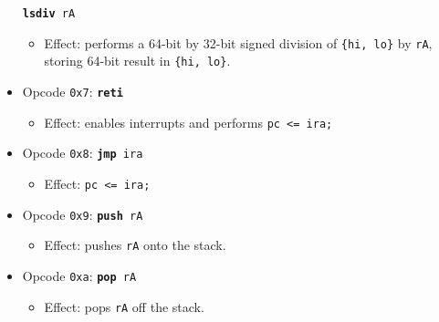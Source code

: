 \documentclass{article}
\begin{document}
\begin{itemize}
			\texttt{\textbf{lsdiv} rA}
		\begin{itemize}
			\item Effect:  performs a 64-bit by 32-bit signed division of
			\texttt{\{hi, lo\}} by \texttt{rA}, storing 64-bit result in
			\texttt{\{hi, lo\}}.
		\end{itemize}
		\item Opcode \texttt{0x7}:
			\texttt{\textbf{reti}}
		\begin{itemize}
			\item Effect:  enables interrupts and performs
			\texttt{pc <= ira;}
		\end{itemize}
		\item Opcode \texttt{0x8}:
			\texttt{\textbf{jmp} ira}
		\begin{itemize}
			\item Effect:  \texttt{pc <= ira;}
		\end{itemize}
		\item Opcode \texttt{0x9}:
			\texttt{\textbf{push} rA}
		\begin{itemize}
			\item Effect:  pushes \texttt{rA} onto the stack.
		\end{itemize}
		\item Opcode \texttt{0xa}:
			\texttt{\textbf{pop} rA}
		\begin{itemize}
			\item Effect:  pops \texttt{rA} off the stack.
		\end{itemize}
	\end{itemize}
	\doublespacing

\end{document}
